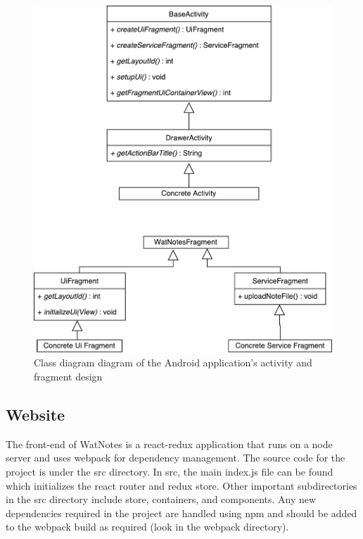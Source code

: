 \documentclass[12pt]{article}
\begin{document}
    \begin{figure}[H]
      \includegraphics[width=\textwidth]{assets/android-activity-class.pdf}
      \caption{Class diagram diagram of the Android application's activity and fragment design}
    \end{figure}

  \subsection{Website}
  The front-end of WatNotes is a react-redux application that runs on a node server and uses webpack for dependency management. The source code for the project is under the src directory. In src, the main index.js file can be found which initializes the react router and redux store. Other important subdirectories in the src directory include store, containers, and components. Any new dependencies required in the project are handled using npm and should be added to the webpack build as required (look in the webpack directory).\\
\end{document}
